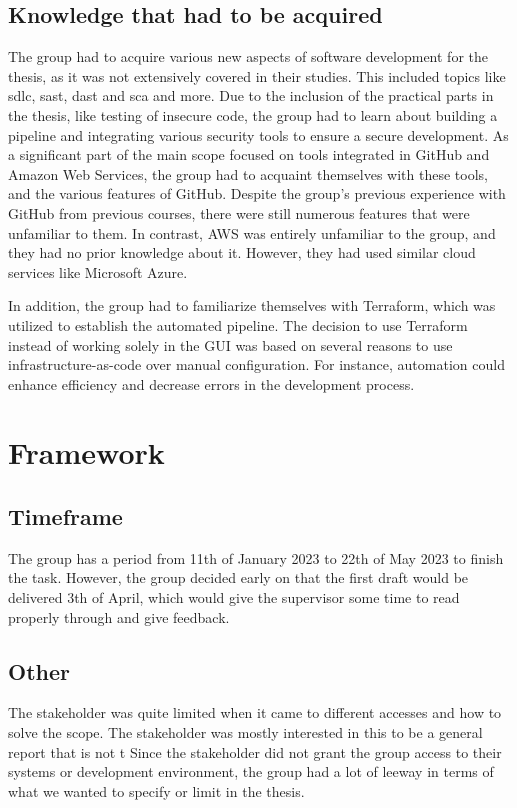 \subsection{Knowledge that had to be acquired}
The group had to acquire various new aspects of software development for the thesis, as it was not extensively covered in their studies. This included topics like \acrshort{sdlc}, \acrlong{sast}, \acrlong{dast} and \acrlong{sca} and more. Due to the inclusion of the practical parts in the thesis, like testing of insecure code, the group had to learn about building a pipeline and integrating various security tools to ensure a secure development. As a significant part of the main scope focused on tools integrated in GitHub and Amazon Web Services, the group had to acquaint themselves with these tools, and the various features of GitHub. Despite the group's previous experience with GitHub from previous courses, there were still numerous features that were unfamiliar to them. In contrast, AWS was entirely unfamiliar to the group, and they had no prior knowledge about it. However, they had used similar cloud services like Microsoft Azure.

In addition, the group had to familiarize themselves with Terraform, which was utilized to establish the automated pipeline. The decision to use Terraform instead of working solely in the GUI was based on several reasons to use infrastructure-as-code over manual configuration. For instance, automation could enhance efficiency and decrease errors in the development process.



\section{Framework}

\subsection{Timeframe}
The group has a period from 11th of January 2023 to 22th of May 2023 to finish the task. However, the group decided early on that the first draft would be delivered 3th of April, which would give the supervisor some time to read properly through and give feedback. 

\subsection{Other}
The stakeholder was quite limited when it came to different accesses and how to solve the scope. The stakeholder was mostly interested in this to be a general report that is not t
Since the stakeholder did not grant the group access to their systems or development environment, the group had a lot of leeway in terms of what we wanted to specify or limit in the thesis. 



